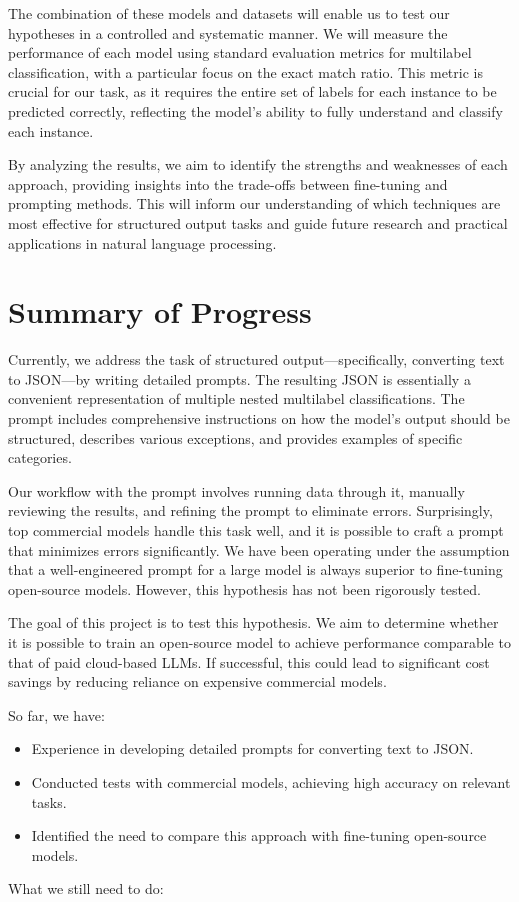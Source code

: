 \documentclass[11pt]{article}
\begin{document}
The combination of these models and datasets will enable us to test our hypotheses in a controlled and systematic manner. We will measure the performance of each model using standard evaluation metrics for multilabel classification, with a particular focus on the exact match ratio. This metric is crucial for our task, as it requires the entire set of labels for each instance to be predicted correctly, reflecting the model’s ability to fully understand and classify each instance.

By analyzing the results, we aim to identify the strengths and weaknesses of each approach, providing insights into the trade-offs between fine-tuning and prompting methods. This will inform our understanding of which techniques are most effective for structured output tasks and guide future research and practical applications in natural language processing.

\section{Summary of Progress} 

Currently, we address the task of structured output—specifically, converting text to JSON—by writing detailed prompts. The resulting JSON is essentially a convenient representation of multiple nested multilabel classifications. The prompt includes comprehensive instructions on how the model’s output should be structured, describes various exceptions, and provides examples of specific categories.

Our workflow with the prompt involves running data through it, manually reviewing the results, and refining the prompt to eliminate errors. Surprisingly, top commercial models handle this task well, and it is possible to craft a prompt that minimizes errors significantly. We have been operating under the assumption that a well-engineered prompt for a large model is always superior to fine-tuning open-source models. However, this hypothesis has not been rigorously tested.

The goal of this project is to test this hypothesis. We aim to determine whether it is possible to train an open-source model to achieve performance comparable to that of paid cloud-based LLMs. If successful, this could lead to significant cost savings by reducing reliance on expensive commercial models.

So far, we have:

\begin{itemize}
   \item Experience in developing detailed prompts for converting text to JSON. \item Conducted tests with commercial models, achieving high accuracy on relevant tasks. \item Identified the need to compare this approach with fine-tuning open-source models.
\end{itemize}
What we still need to do:
\end{document}
